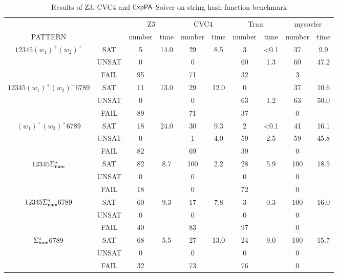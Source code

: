 \begin{table*}[]
    \label{table:string}
    \caption{Results of Z3, CVC4 and ${\sf ExpPA}$-Solver on string hash function benchmark}
    \centering
    \begin{tabular}{cc|cc|cc|cc|cc}
        &  & \multicolumn{2}{c|}{Z3} & \multicolumn{2}{c|}{CVC4} & \multicolumn{2}{c|}{Trau} & \multicolumn{2}{c}{mysovler} \\
       PATTERN &  & number & time & number & time & number & time & number & time \\ \hline
       \multirow{3}{*}{$12345(w_1)^+(w_2)^+$} & SAT & 5 & 14.0 & 29 & 8.5 & 3 & \textless{}0.1 & 37 & 9.9 \\
        & UNSAT & 0 &  & 0 &  & 60 & 1.3 & 60 & 47.2 \\
        & FAIL & 95 &  & 71 &  & 32 &  & 3 &  \\ \hline
       \multirow{3}{*}{$12345(w_1)^+(w_2)^+6789$} & SAT & 11 & 13.0 & 29 & 12.0 & 0 &  & 37 & 10.6 \\
        & UNSAT & 0 &  & 0 &  & 63 & 1.2 & 63 & 50.0 \\
        & FAIL & 89 &  & 71 &  & 37 &  & 0 &  \\ \hline
       \multirow{3}{*}{$(w_1)^+(w_2)^+6789$} & SAT & 18 & 24.0 & 30 & 9.3 & 2 & \textless{}0.1 & 41 & 16.1 \\
        & UNSAT & 0 &  & 1 & 4.0 & 59 & 2.5 & 59 & 45.8 \\
        & FAIL & 82 &  & 69 &  & 39 &  & 0 &  \\ \hline
       \multirow{3}{*}{$12345\Sigma_{\sf num}^*$} & SAT & 82 & 8.7 & 100 & 2.2 & 28 & 5.9 & 100 & 18.5 \\
        & UNSAT & 0 &  & 0 &  & 0 &  & 0 &  \\
        & FAIL & 18 &  & 0 &  & 72 &  & 0 &  \\ \hline
       \multirow{3}{*}{$12345\Sigma_{\sf num}^*6789$} & SAT & 60 & 9.3 & 17 & 7.8 & 3 & 0.3 & 100 & 16.0 \\
        & UNSAT & 0 &  & 0 &  & 0 &  & 0 &  \\
        & FAIL & 40 &  & 83 &  & 97 &  & 0 &  \\ \hline
       \multirow{3}{*}{$\Sigma_{\sf num}^*6789$} & SAT & 68 & 5.5 & 27 & 13.0 & 24 & 9.0 & 100 & 15.7 \\
        & UNSAT & 0 &  & 0 &  & 0 &  & 0 &  \\
        & FAIL & 32 &  & 73 &  & 76 &  & 0 & 
       \end{tabular}
\end{table*}